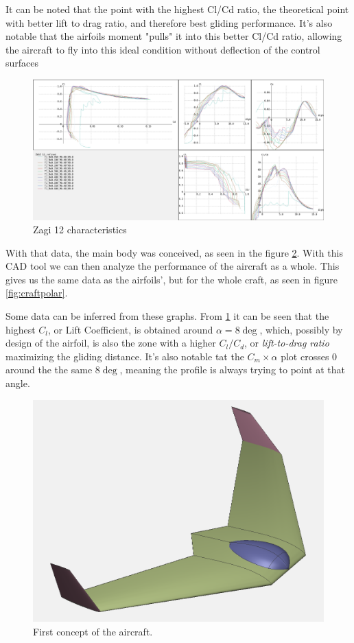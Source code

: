 It can be noted that the point with the highest Cl/Cd ratio, the theoretical point with better lift to drag ratio, and therefore best gliding performance. It's also notable that the airfoils moment "pulls" it into this better Cl/Cd ratio, allowing the aircraft to fly into this ideal condition without deflection of the control surfaces


\begin{figure}
\centering
  \includegraphics[width=\linewidth]{figs/polares.png}
  \caption{Zagi 12 characteristics}
  \label{fig:zagi12polares}
\end{figure}

With that data, the main body was conceived, as seen in the figure \ref{fig:preliminar}. With this CAD tool we can then analyze the performance of the aircraft as a whole. This gives us the same data as the airfoils', but for the whole craft, as seen in figure \ref{fig:craftpolar}.

Some data can be inferred from these graphs. From \ref{fig:zagi12polares} it can be seen that the highest $C_l$, or Lift Coefficient, is obtained around $\alpha = 8\deg$, which, possibly by design of the airfoil, is also the zone with a higher $C_l/C_d$, or \textit{lift-to-drag ratio} maximizing the gliding distance. It's also notable tat the $C_m  \times \alpha$ plot crosses 0 around the the same $8\deg$, meaning the profile is always trying to point at that angle.

\begin{figure}
\centering
  \includegraphics[width=\linewidth]{figs/preliminar.png}
  \caption{First concept of the aircraft.}
  \label{fig:preliminar}
\end{figure}


